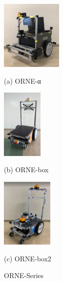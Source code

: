 \documentclass[twocolumn, 9pt]{jsproceedings}
\begin{document}
\begin{figure}[h]
  \centering
  \begin{minipage}[b]{0.3\linewidth}
    \centering
    \includegraphics[width=30mm]{fig/alpha.pdf}
    \caption*{(a) ORNE-α}
  \end{minipage} 
  \hspace{0.03\columnwidth}
  \begin{minipage}[b]{0.3\linewidth}
    \centering
    \includegraphics[height=34mm]{fig/box.pdf}
    \caption*{(b) ORNE-box}
  \end{minipage}
  \begin{minipage}[b]{0.3\linewidth}
    \centering
    \includegraphics[height=34mm]{fig/box2.pdf}
    \caption*{(c) ORNE-box2}
  \end{minipage}
  \caption{ORNE-Series}
  \label{fig:orne-series}%
\end{figure}
\end{document}
